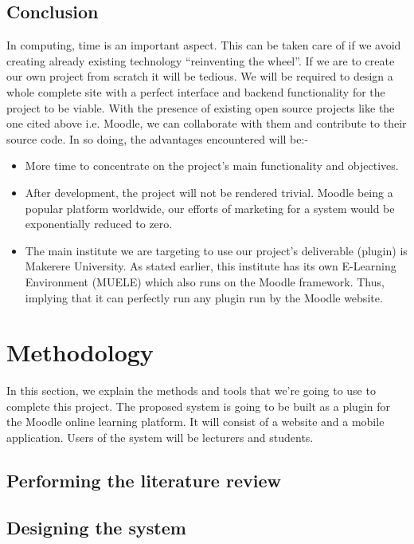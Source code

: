 \documentclass[12pt]{article}
\begin{document}
	\subsection{Conclusion}
	In computing, time is an important aspect. This can be taken care of if we avoid creating already existing technology 			“reinventing the wheel”. If we are to create our own project from scratch it will be tedious. We will be required to design a 		whole complete site with a perfect interface and backend functionality for the project to be viable. With the presence of 		existing open source projects like the one cited above i.e. Moodle, we can collaborate with them and contribute to their 			source code. In so doing, the advantages encountered will be:- 
	 \begin{itemize}
			\item More time to concentrate on the project’s main functionality and objectives.
			\item 	After development, the project will not be rendered trivial. Moodle being a popular platform 							worldwide, our efforts of marketing for a system would be exponentially reduced to zero.
			\item	The main institute we are targeting to use our project’s deliverable (plugin) is Makerere University. As 					stated earlier, this institute has its own E-Learning Environment (MUELE) which also runs on the 						Moodle framework. Thus, implying that it can perfectly run any plugin run by the Moodle website.
		\end{itemize}

\newpage

\section{Methodology}
	In this section, we explain the methods and tools that we're going to use to complete this project. The proposed system is going to be built as a plugin for the Moodle online learning platform. It will consist of a website and a mobile application. Users of the system will be lecturers and students.
	\subsection{Performing the literature review}
		
	\subsection{Designing the  system}
\end{document}
